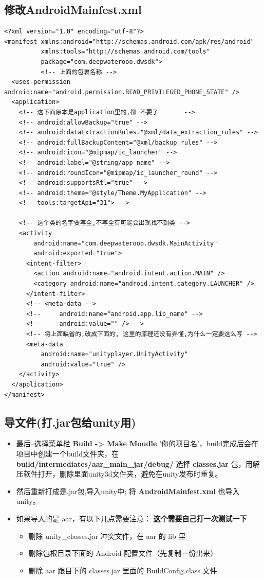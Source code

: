\documentclass[9pt, b5paper]{article}
\begin{document}
\subsection{修改AndroidMainfest.xml}
\label{sec-1-2}
\begin{verbatim}
<?xml version="1.0" encoding="utf-8"?>
<manifest xmlns:android="http://schemas.android.com/apk/res/android"
          xmlns:tools="http://schemas.android.com/tools"
          package="com.deepwaterooo.dwsdk">
          <!-- 上面的包裹名称 -->
  <uses-permission android:name="android.permission.READ_PRIVILEGED_PHONE_STATE" />
  <application>
    <!-- 这下面原本是application里的,都 不要了       -->
    <!-- android:allowBackup="true" -->
    <!-- android:dataExtractionRules="@xml/data_extraction_rules" -->
    <!-- android:fullBackupContent="@xml/backup_rules" -->
    <!-- android:icon="@mipmap/ic_launcher" -->
    <!-- android:label="@string/app_name" -->
    <!-- android:roundIcon="@mipmap/ic_launcher_round" -->
    <!-- android:supportsRtl="true" -->
    <!-- android:theme="@style/Theme.MyApplication" -->
    <!-- tools:targetApi="31"> -->

    <!-- 这个类的名字要写全,不写全有可能会出现找不到类 -->
    <activity
        android:name="com.deepwaterooo.dwsdk.MainActivity" 
        android:exported="true">
      <intent-filter>
        <action android:name="android.intent.action.MAIN" />
        <category android:name="android.intent.category.LAUNCHER" />
      </intent-filter>
      <!-- <meta-data -->
      <!--     android:name="android.app.lib_name" -->
      <!--     android:value="" /> -->
      <!-- 将上面缺省的,改成下面的, 这里的原理还没有弄懂,为什么一定要这么写 -->
      <meta-data
          android:name="unityplayer.UnityActivity"
          android:value="true" />
    </activity>
  </application>
</manifest>
\end{verbatim}
\subsection{导文件(打.jar包给unity用)}
\label{sec-1-3}
\begin{itemize}
\item 最后–选择菜单栏 \textbf{Build -> Make Moudle} ’你的项目名’，build完成后会在项目中创建一个build文件夹，在 \textbf{build/intermediates/aar\_main\_jar/debug/} 选择 \textbf{classes.jar} 包，用解压软件打开，删除里面unity3d文件夹，避免在unity发布时重复。
\item 然后重新打成是.jar包,导入unity中; 将 \textbf{AndroidMainfest.xml} 也导入unity。
\item 如果导入的是 aar，有以下几点需要注意： \textbf{这个需要自己打一次测试一下}
\begin{itemize}
\item 删除 unity\_classes.jar 冲突文件，在 aar 的 lib 里
\item 删除包根目录下面的 Android 配置文件（先复制一份出来）
\item 删除 aar 跟目下的 classes.jar 里面的 BuildConfig.class 文件
\end{itemize}
\end{itemize}
\end{document}
